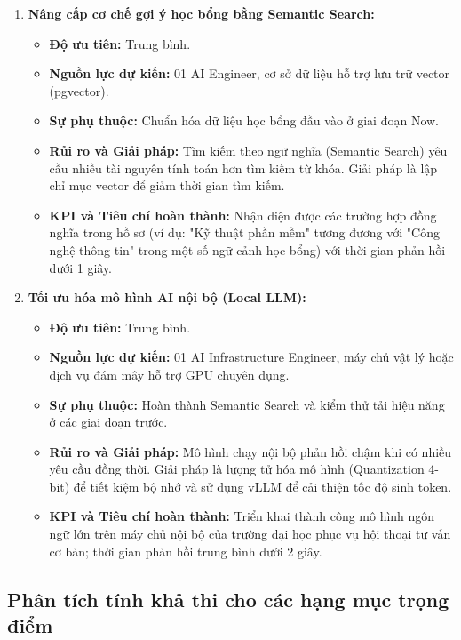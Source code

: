 \begin{enumerate}
    \item \textbf{Nâng cấp cơ chế gợi ý học bổng bằng Semantic Search:}
    \begin{itemize}
        \item \textbf{Độ ưu tiên:} Trung bình.
        \item \textbf{Nguồn lực dự kiến:} 01 AI Engineer, cơ sở dữ liệu hỗ trợ lưu trữ vector (pgvector).
        \item \textbf{Sự phụ thuộc:} Chuẩn hóa dữ liệu học bổng đầu vào ở giai đoạn Now.
        \item \textbf{Rủi ro và Giải pháp:} Tìm kiếm theo ngữ nghĩa (Semantic Search) yêu cầu nhiều tài nguyên tính toán hơn tìm kiếm từ khóa. Giải pháp là lập chỉ mục vector để giảm thời gian tìm kiếm.
        \item \textbf{KPI và Tiêu chí hoàn thành:} Nhận diện được các trường hợp đồng nghĩa trong hồ sơ (ví dụ: "Kỹ thuật phần mềm" tương đương với "Công nghệ thông tin" trong một số ngữ cảnh học bổng) với thời gian phản hồi dưới 1 giây.
    \end{itemize}

    \item \textbf{Tối ưu hóa mô hình AI nội bộ (Local LLM):}
    \begin{itemize}
        \item \textbf{Độ ưu tiên:} Trung bình.
        \item \textbf{Nguồn lực dự kiến:} 01 AI Infrastructure Engineer, máy chủ vật lý hoặc dịch vụ đám mây hỗ trợ GPU chuyên dụng.
        \item \textbf{Sự phụ thuộc:} Hoàn thành Semantic Search và kiểm thử tải hiệu năng ở các giai đoạn trước.
        \item \textbf{Rủi ro và Giải pháp:} Mô hình chạy nội bộ phản hồi chậm khi có nhiều yêu cầu đồng thời. Giải pháp là lượng tử hóa mô hình (Quantization 4-bit) để tiết kiệm bộ nhớ và sử dụng vLLM để cải thiện tốc độ sinh token.
        \item \textbf{KPI và Tiêu chí hoàn thành:} Triển khai thành công mô hình ngôn ngữ lớn trên máy chủ nội bộ của trường đại học phục vụ hội thoại tư vấn cơ bản; thời gian phản hồi trung bình dưới 2 giây.
    \end{itemize}
\end{enumerate}

\subsection{Phân tích tính khả thi cho các hạng mục trọng điểm}
\label{subsec:key-items-analysis}

